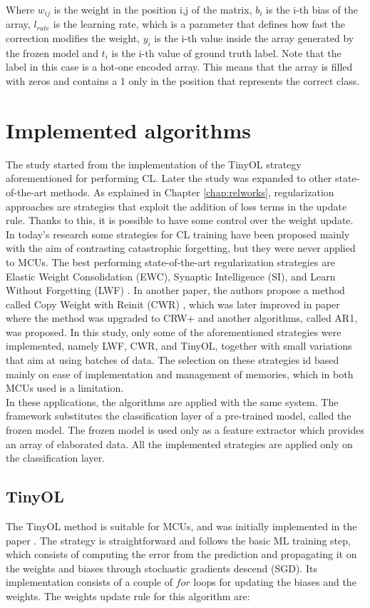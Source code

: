 \documentclass[12pt]{report}
\begin{document}
Where $w_{ij}$ is the weight in the position i,j of the matrix, $b_i$ is the i-th bias of the array, $l_{rate}$ is the learning rate, which is a parameter that defines how fast the correction modifies the weight, $y_i$ is the i-th value inside the array generated by the frozen model and $t_i$ is the i-th value of ground truth label. Note that the label in this case is a hot-one encoded array. This means that the array is filled with zeros and contains a 1 only in the position that represents the correct class.

\section{Implemented algorithms}
The study started from the implementation of the TinyOL strategy aforementioned for performing CL. Later the study was expanded to other state-of-the-art methods. As explained in Chapter \ref{chap:relworks}, regularization approaches are strategies that exploit the addition of loss terms in the update rule. Thanks to this, it is possible to have some control over the weight update. In today's research some strategies for CL training have been proposed mainly with the aim of contrasting catastrophic forgetting, but they were never applied to MCUs. The best performing state-of-the-art regularization strategies are Elastic Weight Consolidation (EWC), Synaptic Intelligence (SI), and Learn Without Forgetting (LWF) \cite{li2017learning}. In another paper, the authors propose a method called Copy Weight with Reinit (CWR) \cite{lomonaco2017core50}, which was later improved in paper \cite{maltoni2019continuous} where the method was upgraded to CRW+ and another algorithms, called AR1, was proposed. In this study, only some of the aforementioned strategies were implemented, namely LWF, CWR, and TinyOL, together with small variations that aim at using batches of data. The selection on these strategies id based mainly on ease of implementation and management of memories, which in both MCUs used is a limitation.\\
In these applications, the algorithms are applied with the same system. The framework substitutes the classification layer of a pre-trained model, called the frozen model. The frozen model is used only as a feature extractor which provides an array of elaborated data. All the implemented strategies are applied only on the classification layer.

\subsection{TinyOL}
The TinyOL method is suitable for MCUs, and was initially implemented in the paper \cite{ren2021tinyol}. The strategy is straightforward and follows the basic ML training step, which consists of computing the error from the prediction and propagating it on the weights and biases through stochastic gradients descend (SGD). Its implementation consists of a couple of $for$ loops for updating the biases and the weights. The weights update rule for this algorithm are:
\end{document}
